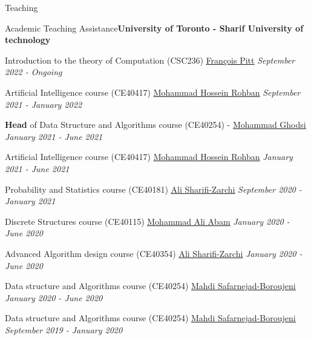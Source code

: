 \documentclass{resume} %
\begin{document}
\begin{rSection}{Teaching}

\begin{rSubsection}{Academic Teaching Assistance}{\textcolor{Black!70}{\bf University of Toronto - Sharif University of technology}}{}{}
\begin{small}
\item Introduction to the theory of Computation (CSC236) \href{https://www.cs.toronto.edu/~fpitt/}{\underline{François Pitt}} \hfill \textcolor{Black!70}{\it September 2022 - Ongoing}
\item Artificial Intelligence course (CE40417) \href{http://blogs.bu.edu/mhrohban/}{\underline{Mohammad Hossein Rohban}} \hfill \textcolor{Black!70}{\it September 2021 - January 2022}
\item {\bf Head}  of Data Structure and Algorithms course (CE40254) - \href{http://sharif.edu/~ghodsi/}{\underline{Mohammad Ghodsi}} \hfill \textcolor{Black!70}{\it January 2021 - June 2021}
\item Artificial Intelligence course (CE40417) \href{http://blogs.bu.edu/mhrohban/}{\underline{Mohammad Hossein Rohban}} \hfill \textcolor{Black!70}{\it January 2021 - June 2021}
\item Probability and Statistics course (CE40181) \href{https://scholar.google.com/citations?user=GbJMZLIAAAAJ&hl=en}{\underline{Ali Sharifi-Zarchi}} \hfill \textcolor{Black!70}{\it September 2020 - January 2021}
\item Discrete Structures course (CE40115) \href{https://scholar.google.com/citations?user=xuNJ-d8AAAAJ&hl=en}{\underline{Mohammad Ali Abam}} \hfill \textcolor{Black!70}{\it January 2020 - June 2020}
\item Advanced Algorithm design course (CE40354) \href{https://scholar.google.com/citations?user=GbJMZLIAAAAJ&hl=en}{\underline{Ali Sharifi-Zarchi}} \hfill \textcolor{Black!70}{\it January 2020 - June 2020} 
\item Data structure and Algorithms course (CE40254) \href{https://scholar.google.com/citations?user=TNfL9SIAAAAJ&hl=en}{\underline{Mahdi Safarnejad-Boroujeni}} \hfill \textcolor{Black!70}{\it January 2020 - June 2020}
\item Data structure and Algorithms course (CE40254) \href{https://scholar.google.com/citations?user=TNfL9SIAAAAJ&hl=en}{\underline{Mahdi Safarnejad-Boroujeni}} \hfill \textcolor{Black!70}{\it September 2019 - January 2020}
\end{small}
\end{rSubsection}

\end{rSection}
\end{document}
